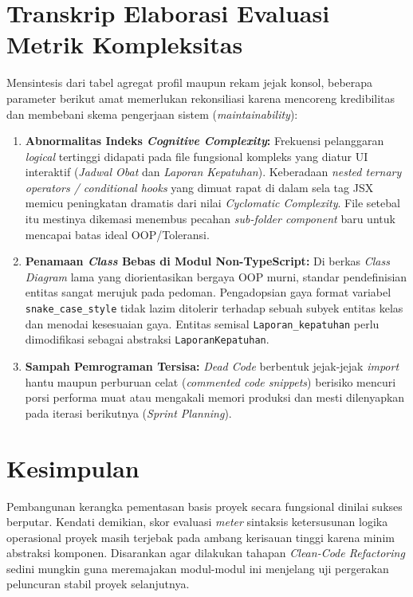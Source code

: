 \documentclass[12pt, a4paper]{article}
\begin{document}
\section{Transkrip Elaborasi Evaluasi Metrik Kompleksitas}
Mensintesis dari tabel agregat profil maupun rekam jejak konsol, beberapa parameter berikut amat memerlukan rekonsiliasi karena mencoreng kredibilitas dan membebani skema pengerjaan sistem (\textit{maintainability}):

\begin{enumerate}
    \item \textbf{Abnormalitas Indeks \textit{Cognitive Complexity}:} Frekuensi pelanggaran \textit{logical} tertinggi didapati pada file fungsional kompleks yang diatur UI interaktif (\textit{Jadwal Obat} dan \textit{Laporan Kepatuhan}). Keberadaan \textit{nested ternary operators / conditional hooks} yang dimuat rapat di dalam sela tag JSX memicu peningkatan dramatis dari nilai \textit{Cyclomatic Complexity}. File setebal itu mestinya dikemasi menembus pecahan \textit{sub-folder component} baru untuk mencapai batas ideal OOP/Toleransi.
    
    \item \textbf{Penamaan \textit{Class} Bebas di Modul Non-TypeScript:} Di berkas \textit{Class Diagram} lama yang diorientasikan bergaya OOP murni, standar pendefinisian entitas sangat merujuk pada pedoman. Pengadopsian gaya format variabel \texttt{snake\_case\_style} tidak lazim ditolerir terhadap sebuah subyek entitas kelas dan menodai kesesuaian gaya. Entitas semisal \texttt{Laporan\_kepatuhan} perlu dimodifikasi sebagai abstraksi \texttt{LaporanKepatuhan}.
    
    \item \textbf{Sampah Pemrograman Tersisa:} \textit{Dead Code} berbentuk jejak-jejak \textit{import} hantu maupun perburuan celat (\textit{commented code snippets}) berisiko mencuri porsi performa muat atau mengakali memori produksi dan mesti dilenyapkan pada iterasi berikutnya (\textit{Sprint Planning}).
\end{enumerate}

\section{Kesimpulan}
Pembangunan kerangka pementasan basis proyek secara fungsional dinilai sukses berputar. Kendati demikian, skor evaluasi \textit{meter} sintaksis ketersusunan logika operasional proyek masih terjebak pada ambang kerisauan tinggi karena minim abstraksi komponen. Disarankan agar dilakukan tahapan \textit{Clean-Code Refactoring} sedini mungkin guna meremajakan modul-modul ini menjelang uji pergerakan peluncuran stabil proyek selanjutnya.
\end{document}
